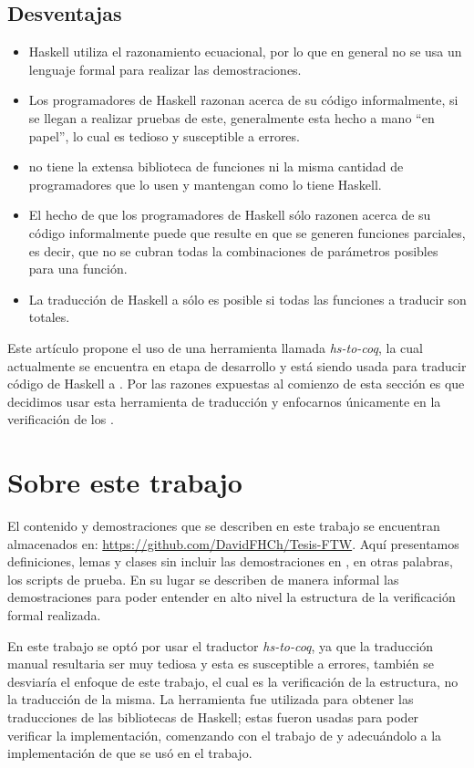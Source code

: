 \subsection{Desventajas}
\begin{itemize}
    \item Haskell utiliza el razonamiento ecuacional, por lo que en general no se usa un lenguaje 
    formal para realizar las demostraciones.
    \item Los programadores de Haskell razonan acerca de su código informalmente, si se llegan a
    realizar pruebas de este, generalmente esta hecho a mano ``en papel'', lo cual es tedioso y
    susceptible a errores.
    \item {\coq} no tiene la extensa biblioteca de funciones ni la misma cantidad de programadores
    que lo usen y mantengan como lo tiene Haskell.
    \item El hecho de que los programadores de Haskell s\'olo razonen acerca de su código
    informalmente puede que resulte en que se generen funciones parciales, es decir, que no se
    cubran todas la combinaciones de parámetros posibles para una funci\'on.
    \item La traducci\'on de Haskell a {\coq} s\'olo es posible si todas las funciones a traducir 
    son totales.
\end{itemize}

Este art\'iculo propone el uso de una herramienta llamada \textit{hs-to-coq}, la cual actualmente se
encuentra en etapa de desarrollo y est\'a siendo usada para traducir código de Haskell a {\coq}. Por
las razones expuestas al comienzo de esta secci\'on es que decidimos usar esta herramienta de 
traducci\'on y enfocarnos \'unicamente en la verificaci\'on de los {\arns}.

\section{Sobre este trabajo}
El contenido y demostraciones que se describen en este trabajo se encuentran almacenados en:
\url{https://github.com/DavidFHCh/Tesis-FTW}. Aqu\'i presentamos definiciones, lemas y clases sin
incluir las demostraciones en {\coq}, en otras palabras, los scripts de prueba. En su lugar se 
describen de manera informal las demostraciones para poder entender en alto nivel la estructura de 
la verificaci\'on formal realizada.

En este trabajo se opt\'o por usar el traductor \textit{hs-to-coq}, ya que la traducci\'on manual
resultaria ser muy tediosa y esta es susceptible a errores, tambi\'en se desviaría el enfoque de
este trabajo, el cual es la verificaci\'on de la estructura, no la traducci\'on de la misma. La
herramienta fue utilizada para obtener las traducciones de las bibliotecas de Haskell; estas fueron
usadas para poder verificar la implementación, comenzando con el trabajo de \cite{tesisG} y 
adecuándolo a la implementaci\'on de \cite{MSetRBT} que se us\'o en el trabajo.

